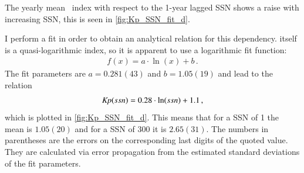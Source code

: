 The yearly mean \Kp~index with respect to the 1-year lagged SSN shows a raise with increasing SSN, this is seen in \autoref{fig:Kp_SSN_fit_d}.
\begin{figure}
\end{figure}
I perform a fit in order to obtain an analytical relation for this dependency. \Kp{} itself is a quasi-logarithmic index, so it is apparent to use a logarithmic fit function:
\begin{align}
	f(x) = a \cdot \ln(x) + b	\,.	\label{eq:log_fit_function}
\end{align}
The fit parameters are $a = 0.281(43)$ and $b = 1.05(19)$ and lead to the relation
\begin{align}
	\textit{Kp}(ssn) = 0.28 \cdot \ln(ssn) + 1.1	\,,	\label{eq:kp_ssn_relation}
\end{align}
which is plotted in \autoref{fig:Kp_SSN_fit_d}. This means that for a SSN of 1 the mean \Kp{} is $1.05(20)$ and for a SSN of 300 it is $2.65(31)$. The numbers in parentheses are the errors on the corresponding last digits of the quoted value. They are calculated via error propagation from the estimated standard deviations of the fit parameters.


